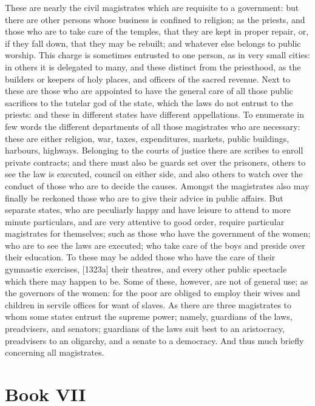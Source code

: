 \documentclass[12pt]{article}
\begin{document}
These are nearly the civil magistrates which are requisite to a government: but there are other persons whose business is confined to religion; as the priests, and those who are to take care of the temples, that they are kept in proper repair, or, if they fall down, that they may be rebuilt; and whatever else belongs to public worship. This charge is sometimes entrusted to one person, as in very small cities: in others it is delegated to many, and these distinct from the priesthood, as the builders or keepers of holy places, and officers of the sacred revenue. Next to these are those who are appointed to have the general care of all those public sacrifices to the tutelar god of the state, which the laws do not entrust to the priests: and these in different states have different appellations. To enumerate in few words the different departments of all those magistrates who are necessary: these are either religion, war, taxes, expenditures, markets, public buildings, harbours, highways. Belonging to the courts of justice there are scribes to enroll private contracts; and there must also be guards set over the prisoners, others to see the law is executed, council on either side, and also others to watch over the conduct of those who are to decide the causes. Amongst the magistrates also may finally be reckoned those who are to give their advice in public affairs. But separate states, who are peculiarly happy and have leisure to attend to more minute particulars, and are very attentive to good order, require particular magistrates for themselves; such as those who have the government of the women; who are to see the laws are executed; who take care of the boys and preside over their education. To these may be added those who have the care of their gymnastic exercises, [1323a] their theatres, and every other public spectacle which there may happen to be. Some of these, however, are not of general use; as the governors of the women: for the poor are obliged to employ their wives and children in servile offices for want of slaves. As there are three magistrates to whom some states entrust the supreme power; namely, guardians of the laws, preadvisers, and senators; guardians of the laws suit best to an aristocracy, preadvisers to an oligarchy, and a senate to a democracy. And thus much briefly concerning all magistrates.

\section*{Book VII}
\end{document}
